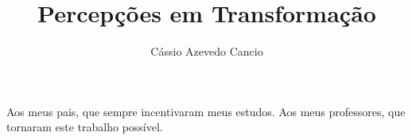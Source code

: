 \documentclass[a4paper,12pt,twoside,english,brazilian]{book}
\title{Percepções em Transformação}[Os Impactos da IA Generativa na Produção de Software]
\author{Cássio Azevedo Cancio}
\begin{document}

\frontmatter

\pagestyle{plain}

\onehalfspacing%

\maketitle %


\begin{dedicatoria}
  Aos meus pais, que sempre incentivaram meus estudos.
  Aos meus professores, que tornaram este trabalho possível.
\end{dedicatoria}


 


\cleardoublepage%


\newcommand\disablenewpage[1]{{\let\clearpage\par\let\cleardoublepage\par #1}}
\end{document}
